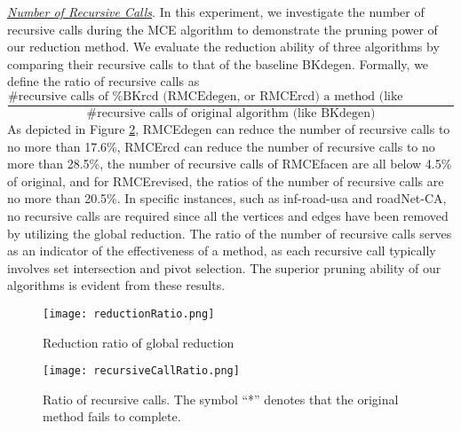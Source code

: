 \documentclass[sigconf, nonacm]{acmart}
\newcommand{\red}[1]{{\color{red}{#1}}}
\begin{document}
\noindent\textit{{\underline{Number of Recursive Calls}}}. 
In this experiment, we investigate the number of recursive calls during the MCE algorithm to demonstrate the pruning power of our reduction method. We evaluate the reduction ability of three algorithms by comparing their recursive calls to that of the baseline BKdegen. 
Formally, we define the ratio of recursive calls as 
$$\frac{\#\text{recursive calls of %
a method (like RMCEdegen) 
} }{\#\text{recursive calls of original algorithm (like BKdegen)}}$$
As depicted in Figure \ref{recursiveCount}, RMCEdegen can reduce the number of recursive calls to no more than 17.6\%, RMCErcd can reduce the number of recursive calls to no more than 28.5\%, the number of recursive calls of RMCEfacen are all below 4.5\% of original, and for RMCErevised, the ratios of the number of recursive calls are no more than 20.5\%. 
In specific instances, such as inf-road-usa and roadNet-CA, 
no recursive calls are required since all the vertices and edges have been removed by utilizing the global reduction. 
The ratio of the number of recursive calls serves as an indicator of the effectiveness of a method, as each recursive call typically involves set intersection and pivot selection. 
The superior pruning ability of our algorithms 
is evident from these results.

\begin{figure}[tbp]
\centerline{\texttt{[image: reductionRatio.png]}}
\vspace{-0.1in}
\caption{Reduction ratio of global reduction}
\label{reductionratio}
\vspace{-0.1in}
\end{figure}

\begin{figure}[tbp]
\centerline{\texttt{[image: recursiveCallRatio.png]}}
\vspace{-0.125in}
\caption{Ratio of recursive calls. The symbol ``*'' denotes that the original method fails to complete. %
}
\label{recursiveCount}
\vspace{-0.075in}
\end{figure}
\end{document}
